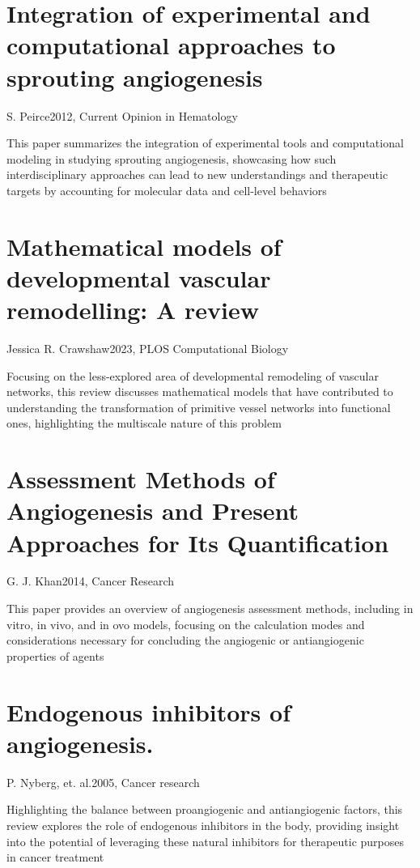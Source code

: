 \section{Integration of experimental and computational approaches to sprouting angiogenesis}{S. Peirce}{2012, Current Opinion in Hematology}

This paper summarizes the integration of experimental tools and computational modeling in studying sprouting angiogenesis, showcasing how such interdisciplinary approaches can lead to new understandings and therapeutic targets by accounting for molecular data and cell-level behaviors \cite{Peirce2012}

\section{Mathematical models of developmental vascular remodelling: A review}{Jessica R. Crawshaw}{2023, PLOS Computational Biology}

Focusing on the less-explored area of developmental remodeling of vascular networks, this review discusses mathematical models that have contributed to understanding the transformation of primitive vessel networks into functional ones, highlighting the multiscale nature of this problem \cite{Crawshaw2023}

\section{Assessment Methods of Angiogenesis and Present Approaches for Its Quantification}{G. J. Khan}{2014, Cancer Research}

This paper provides an overview of angiogenesis assessment methods, including in vitro, in vivo, and in ovo models, focusing on the calculation modes and considerations necessary for concluding the angiogenic or antiangiogenic properties of agents\cite{Khan2014}

\section{Endogenous inhibitors of angiogenesis.}{P. Nyberg, et. al.}{2005, Cancer research}

Highlighting the balance between proangiogenic and antiangiogenic factors, this review explores the role of endogenous inhibitors in the body, providing insight into the potential of leveraging these natural inhibitors for therapeutic purposes in cancer treatment \cite{Nyberg2005}

